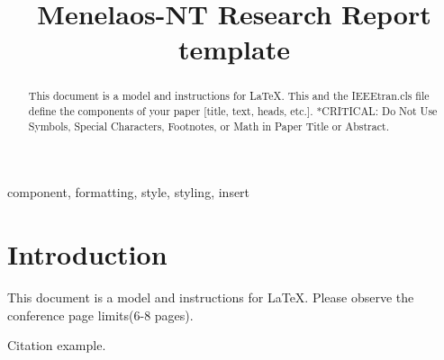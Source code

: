 \documentclass[conference]{IEEEtran}
\begin{document}
\title{Menelaos-NT Research Report template}

\author{
\and
{}
\and
{}
}

\maketitle

\begin{abstract}
This document is a model and instructions for \LaTeX.
This and the IEEEtran.cls file define the components of your paper [title, text, heads, etc.]. *CRITICAL: Do Not Use Symbols, Special Characters, Footnotes, 
or Math in Paper Title or Abstract.
\end{abstract}

\begin{IEEEkeywords}
component, formatting, style, styling, insert
\end{IEEEkeywords}

\thispagestyle{firstpagefooter}

\section{Introduction}
This document is a model and instructions for \LaTeX.
Please observe the conference page limits(6-8 pages).

Citation example\cite{puente2013review}.

\lipsum[1-30]%

 






\end{document}

